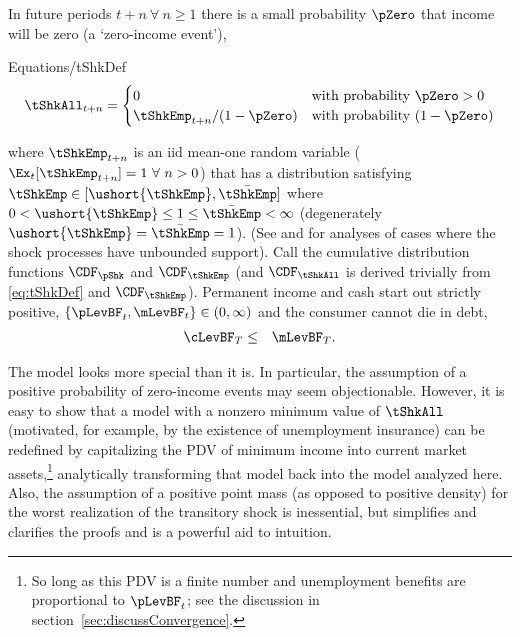 \documentclass[titlepage]{\econtex}\providecommand{\texname}{BufferStockTheory}%
\providecommand{\EqDir}{Equations}
\begin{document}
In future periods $t+n ~\forall~ n \geq 1$ there is a small probability $\pZero$ that income will
be zero (a `zero-income event'),
\begin{verbatimwrite}{\EqDir/tShkDef}
\begin{equation}
\tShkAll _{t+n}=
\begin{cases}
 0\phantom{_{t+1}/\pNotZero} & \text{with probability $\pZero>0$} \\
 \tShkEmp_{t+n}/\pNotZero      & \text{with probability $\pNotZero  $} %
\end{cases} \label{eq:tShkDef}
\end{equation}
\end{verbatimwrite}

where $\tShkEmp_{t+n}$ is an iid mean-one random variable
($\Ex_{t}[{\tShkEmp}_{t+n}]=1~\forall~n>0$)
that has a distribution
satisfying $\tShkEmp \in \lbrack \ushort{\tShkEmp},\bar{\tShkEmp}\rbrack$
where $0<\ushort{\tShkEmp} \leq 1 \leq \bar{\tShkEmp}<\infty$
(degenerately $\ushort{\tShkEmp}=\bar{\tShkEmp}=1$). (See \cite{rabaultBorrowing} and \cite{lsIncFluct} for analyses of cases where the shock processes have unbounded support).  Call the cumulative
distribution functions $\CDF_{\pShk}$ and $\CDF_{\tShkEmp}$ (and $\CDF_{\tShkAll}$
is derived trivially from \eqref{eq:tShkDef} and $\CDF_{\tShkEmp}$).
Permanent income and cash start out strictly positive, $\{\pLevBF_{t},\mLevBF_{t}\} \in
(0,\infty)$ and the consumer cannot die in
debt,
\begin{eqnarray}
  \cLevBF_{T} & \leq & \mLevBF_{T} \label{eq:NoDebtAtDeath}.
\end{eqnarray}

The model looks more special than it is.  In particular, the
assumption of a positive probability of zero-income events may seem
objectionable.  However, it is easy to show that a model with a
nonzero minimum value of $\tShkAll$ (motivated, for example, by the
existence of unemployment insurance) can be redefined by capitalizing
the PDV of minimum income into current market assets,\footnote{So long
  as this PDV is a finite number and unemployment benefits are
  proportional to $\pLevBF_{t}$; see the discussion in
  section~\ref{sec:discussConvergence}.}  analytically transforming
that model back into the model analyzed here.  Also, the assumption of
a positive point mass (as opposed to positive density) for the worst
realization of the transitory shock is inessential, but simplifies and
clarifies the proofs and is a powerful aid to intuition.
\end{document}
